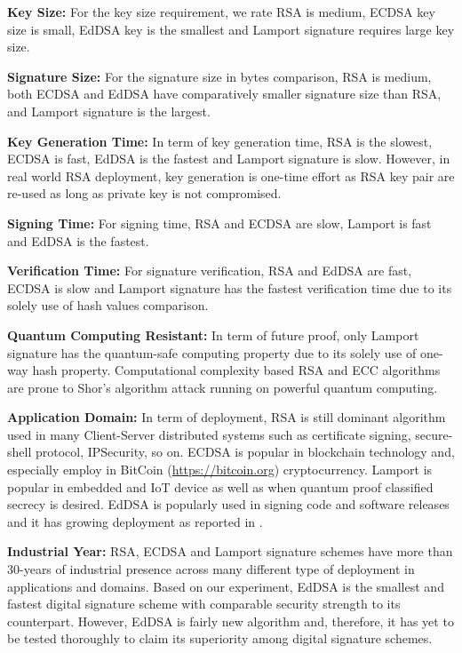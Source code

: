 \documentclass[10pt,sigconf]{acmart}
\begin{document}
\noindent \textbf{Key Size:} \quad For the key size requirement, we rate RSA is medium, ECDSA key size is small, EdDSA key is the smallest and Lamport signature requires large key size.

\noindent \textbf{Signature Size:} \quad For the signature size in bytes comparison, RSA is medium, both ECDSA and EdDSA have comparatively smaller signature size than RSA, and Lamport signature is the largest. 

\noindent \textbf{Key Generation Time:} \quad In term of key generation time, RSA is the slowest, ECDSA is fast, EdDSA is the fastest and Lamport signature is slow. However, in real world RSA deployment, key generation is one-time effort as RSA key pair are re-used as long as private key is not compromised.

\noindent \textbf{Signing Time:} \quad For signing time, RSA and ECDSA are slow, Lamport is fast and EdDSA is the fastest.

\noindent \textbf{Verification Time:} \quad For signature verification, RSA and EdDSA are fast, ECDSA is slow and Lamport signature has the fastest verification time due to its solely use of hash values comparison.

\noindent \textbf{Quantum Computing Resistant:} \quad In term of future proof, only Lamport signature has the quantum-safe computing property due to its solely use of one-way hash property. Computational complexity based RSA and ECC algorithms are prone to Shor's algorithm \cite{Shor:1997:PAP:264393.264406} attack running on powerful quantum computing.

\noindent \textbf{Application Domain:} \quad In term of deployment, RSA is still dominant algorithm used in many Client-Server distributed systems such as certificate signing, secure-shell protocol, IPSecurity, so on. ECDSA is popular in blockchain technology and, especially employ in BitCoin (\url {https://bitcoin.org}) cryptocurrency. Lamport is popular in embedded and IoT device as well as when quantum proof classified secrecy is desired. EdDSA is popularly used in signing code and software releases and it has growing deployment as reported in \cite{ianix}. 

\noindent \textbf{Industrial Year:} \quad RSA, ECDSA and Lamport signature schemes have more than 30-years of industrial presence across many different type of deployment in applications and domains. Based on our experiment, EdDSA is the smallest and fastest digital signature scheme with comparable security strength to its counterpart. However, EdDSA is fairly new algorithm and, therefore, it has yet to be tested thoroughly to claim its superiority among digital signature schemes.
\end{document}
